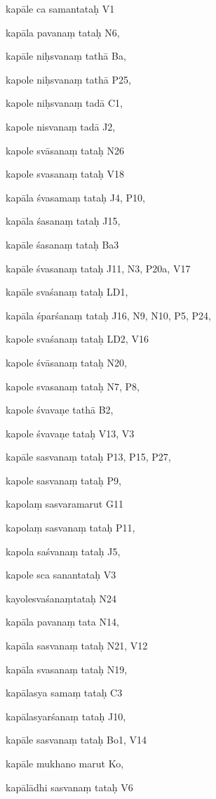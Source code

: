 \begin{ekdosis}
\begin{marma}[hp01_055]
\begin{marma}[hp02_009]
\begin{marma}[hp02_011]
\begin{marma}[hp02_62b]
\item[kapāle ca samantataḥ] V1 
\item[kapāla pavanaṃ tataḥ] N6, 
\item[kapāle niḥsvanaṃ tathā] Ba,
\item[kapole niḥsvanaṃ tathā] P25, 
\item[kapole niḥsvanaṃ tadā] C1, 
\item[kapole nisvanaṃ tadā] J2, 
\item[kapole svāsanaṃ tataḥ] N26
\item[kapole svasanaṃ tataḥ] V18
\item[kapāla śvasamaṃ tataḥ] J4, P10, 
\item[kapāla śasanaṃ tataḥ] J15, 
\item[kapāle śasanaṃ tataḥ] Ba3
\item[kapāle śvasanaṃ tataḥ] J11, N3, P20a, V17 
\item[kapāle svaśanaṃ tataḥ] LD1, 
\item[kapāla śparśanaṃ tataḥ] J16, N9, N10, P5, P24, 
\item[kapole svaśanaṃ tataḥ] LD2, V16
\item[kapole śvāsanaṃ tataḥ] N20, 
\item[kapole svasanaṃ tataḥ] N7, P8, 
\item[kapole śvavaṇe tathā] B2,
\item[kapole śvavaṇe tataḥ] V13, V3
\item[kapāle sasvanaṃ tataḥ] P13, P15, P27, 
\item[kapole sasvanaṃ tataḥ] P9,
\item[kapolaṃ sasvaramarut] G11
\item[kapolaṃ sasvanaṃ tataḥ] P11, 
\item[kapola saśvanaṃ tataḥ] J5,
\item[kapole sca sanantataḥ] V3
\item[kayolesvaśanaṃtataḥ] N24
\item[kapāla pavanaṃ tata] N14, 
\item[kapāla sasvanaṃ tataḥ] N21, V12
\item[kapāla svasanaṃ tataḥ] N19, 
\item[kapālasya samaṃ tataḥ] C3
\item[kapālasyarśanaṃ tataḥ] J10, 
\item[kapāle sasvanaṃ tataḥ] Bo1, V14
\item[kapāle mukhano marut] Ko,
\item[kapālādhi sasvanaṃ tataḥ] V6

\end{marma}
\end{marma}
\end{marma}
\end{marma}
\end{ekdosis}
